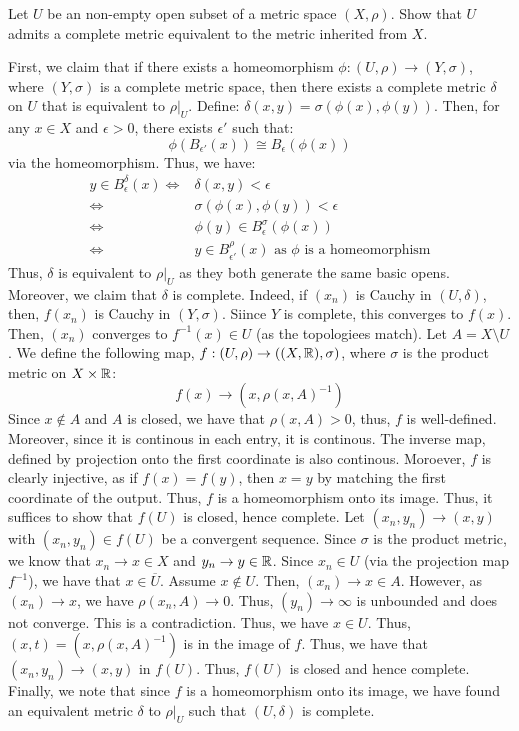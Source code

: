 \documentclass[12pt]{article}
\begin{document}
\begin{problab}{10}
    Let $U$ be an non-empty open subset of a metric space $(X, \rho)$. Show that $U$ admits a complete metric equivalent to the metric inherited from $X$.
\end{problab}
\begin{solu}
    First, we claim that if there exists a homeomorphism $\phi: (U, \rho) \to (Y, \sigma)$, where $(Y, \sigma)$ is a complete metric space, then there exists a complete metric $\delta$ on $U$ that is equivalent to $\rho|_U$. Define: $\delta(x,y) = \sigma(\phi(x), \phi(y))$. Then, for any $x \in X$ and $\epsilon > 0$, there exists $\epsilon'$ such that:
    \[\phi(B_{\epsilon'}(x)) \cong B_{\epsilon}(\phi(x))\] 
    via the homeomorphism. Thus, we have:
    \begin{align*}
        y \in B_\epsilon^\delta(x) \iff& \delta(x, y) < \epsilon \\
        \iff& \sigma(\phi(x), \phi(y)) < \epsilon \\
        \iff& \phi(y) \in B_\epsilon^\sigma(\phi(x)) \\
        \iff& y \in B_{\epsilon'}^\rho(x) \text{ as $\phi$ is a homeomorphism}
    \end{align*}
    Thus, $\delta$ is equivalent to $\rho|_U$ as they both generate the same basic opens. Moreover, we claim that $\delta$ is complete. Indeed, if $(x_n)$ is Cauchy in $(U, \delta)$, then, $f(x_n)$ is Cauchy in $(Y, \sigma)$. Siince $Y$ is complete, this converges to $f(x)$. Then, $(x_n)$ converges to $f^{-1}(x) \in U$ (as the topologiees match). \bbni
    Let $A = X \setminus U$. We define the following map, $f : (U, \rho) \to ((X, \mathbb R), \sigma)$, where $\sigma$ is the product metric on $X \times \mathbb R$: 
    \[f(x) \to (x, \rho(x, A)^{-1})\]
    Since $x \not \in A$ and $A$ is closed, we have that $\rho(x, A) > 0$, thus, $f$ is well-defined. Moreover, since it is continous in each entry, it is continous. The inverse map, defined by projection onto the first coordinate is also continous. Moroever, $f$ is clearly injective, as if $f(x) = f(y)$, then $x = y$ by matching the first coordinate of the output. Thus, $f$ is a homeomorphism onto its image. \bbni
    Thus, it suffices to show that $f(U)$ is closed, hence complete. Let $(x_n, y_n) \to (x, y)$ with $(x_n, y_n) \in f(U)$ be a convergent sequence. Since $\sigma$ is the product metric, we know that $x_n \to x \in X$ and $y_n \to y \in \mathbb R$. Since $x_n \in U$ (via the projection map $f^{-1}$), we have that $x \in \overline{U}$. \bbni 
    Assume $x \not \in U$. Then, $(x_n) \to x \in A$. However, as $(x_n) \to x$, we have $\rho(x_n, A) \to 0$. Thus, $(y_n) \to \infty$ is unbounded and does not converge. This is a contradiction. Thus, we have $x \in U$. \bbni
    Thus, $(x, t) = (x, \rho(x, A)^{-1})$ is in the image of $f$. Thus, we have that $(x_n, y_n) \to (x, y)$ in $f(U)$. Thus, $f(U)$ is closed and hence complete. \bbni
    Finally, we note that since $f$ is a homeomorphism onto its image, we have found an equivalent metric $\delta$ to $\rho|_U$ such that $(U, \delta)$ is complete.
\end{solu}
\end{document}
